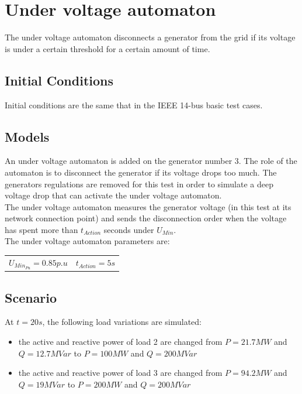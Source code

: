\documentclass[a4paper, 12pt]{report}
\begin{document}
\newpage
\section{Under voltage automaton}
\label{UnderVoltageAutomaton}

The under voltage automaton disconnects a generator from the grid if its voltage is under a certain threshold for a certain amount of time.

\subsection{Initial Conditions}

Initial conditions are the same that in the IEEE 14-bus basic test cases.

\subsection{Models}

An under voltage automaton is added on the generator number 3. The role of the automaton is to disconnect the generator if its voltage drops too much. The generators regulations are removed for this test in order to simulate a deep voltage drop that can activate the under voltage automaton.\\

The under voltage automaton measures the generator voltage (in this test at its network connection point) and sends the disconnection order when the voltage has spent more than $t_{Action}$ seconds under $U_{Min}$.\\

The under voltage automaton parameters are:
\begin{center}
\begin{tabular}{l|l}
   $U_{Min_{Pu}}=0.85p.u$ & $t_{Action}=5s$  \\
\end{tabular}
\end{center}

\subsection{Scenario}
At $t=20s$, the following load variations are simulated:
\begin{itemize}
\item{the active and reactive power of load 2 are changed from $P=21.7MW$ and $Q=12.7MVar$ to $P=100MW$ and $Q=200MVar$}
\item{the active and reactive power of load 3 are changed from $P=94.2MW$ and $Q=19MVar$ to $P=200MW$ and $Q=200MVar$}
\end{itemize}
\end{document}
